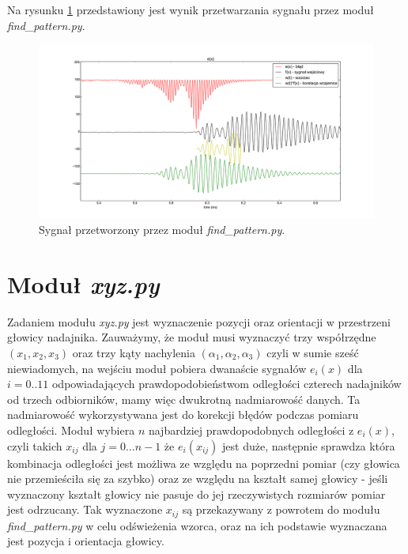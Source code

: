  Na rysunku \ref{fig:blad_korel} przedstawiony jest wynik przetwarzania sygnału przez moduł \textit{find\_pattern.py}.
 
 \begin{figure}[h!]
    \centering
    \includegraphics[width=1.15\textwidth, trim= 47mm 0mm 0mm 0mm,clip]{blad_korel}
    \caption{Sygnał przetworzony przez moduł \textit{find\_pattern.py}.}
    \label{fig:blad_korel}
\end{figure}
 

 
\section{Moduł \textit{xyz.py}}

Zadaniem modułu \textit{xyz.py} jest wyznaczenie pozycji oraz orientacji w przestrzeni głowicy nadajnika.
Zauważymy, że moduł musi wyznaczyć trzy współrzędne $(x_1,x_2,x_3)$
oraz trzy kąty nachylenia $(\alpha_1, \alpha_2, \alpha_3)$ czyli w sumie sześć niewiadomych,
na wejściu moduł pobiera dwanaście sygnałów $e_i(x)$ dla $i=0..11$ odpowiadających prawdopodobieństwom odległości
czterech nadajników od trzech odbiorników, mamy więc dwukrotną nadmiarowość danych.
Ta nadmiarowość wykorzystywana jest do korekcji błędów podczas pomiaru odległości.
Moduł wybiera $n$ najbardziej prawdopodobnych odległości z $e_i(x)$, czyli takich $x_{ij}$ dla $j = 0...n-1$
że $e_i(x_{ij})$ jest duże, następnie sprawdza która kombinacja 
odległości jest możliwa ze względu na poprzedni pomiar (czy głowica nie przemieściła się za szybko)
oraz ze względu na kształt samej głowicy - jeśli wyznaczony kształt głowicy nie pasuje do jej rzeczywistych
rozmiarów pomiar jest odrzucany.
Tak wyznaczone $x_{ij}$ są przekazywany z powrotem do modułu \textit{find\_pattern.py} w celu odświeżenia wzorca,
oraz na ich podstawie wyznaczana jest pozycja i orientacja głowicy.

